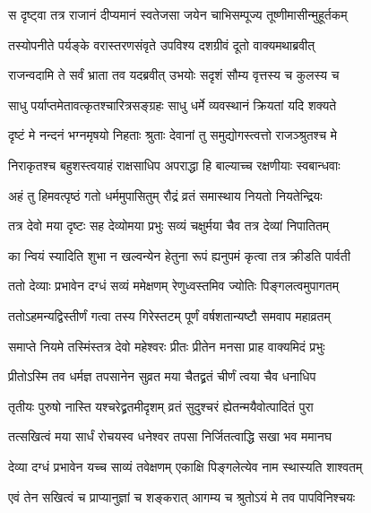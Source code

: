 \twolineshloka
{स दृष्ट्वा तत्र राजानं दीप्यमानं स्वतेजसा}
{जयेन चाभिसम्पूज्य तूष्णीमासीन्मुहूर्तकम्} %

\twolineshloka
{तस्योपनीते पर्यङ्के वरास्तरणसंवृते}
{उपविश्य दशग्रीवं दूतो वाक्यमथाब्रवीत्} %

\twolineshloka
{राजन्वदामि ते सर्वं भ्राता तव यदब्रवीत्}
{उभयोः सदृशं सौम्य वृत्तस्य च कुलस्य च} %

\twolineshloka
{साधु पर्याप्तमेतावत्कृतश्चारित्रसङ्ग्रहः}
{साधु धर्मे व्यवस्थानं क्रियतां यदि शक्यते} %

\twolineshloka
{दृष्टं मे नन्दनं भग्नमृषयो निहताः श्रुताः}
{देवानां तु समुद्योगस्त्वत्तो राजञ्श्रुतश्च मे} %

\twolineshloka
{निराकृतश्च बहुशस्त्वयाहं राक्षसाधिप}
{अपराद्धा हि बाल्याच्च रक्षणीयाः स्वबान्धवाः} %

\twolineshloka
{अहं तु हिमवत्पृष्ठं गतो धर्ममुपासितुम्}
{रौद्रं व्रतं समास्थाय नियतो नियतेन्द्रियः} %

\twolineshloka
{तत्र देवो मया दृष्टः सह देव्योमया प्रभुः}
{सव्यं चक्षुर्मया चैव तत्र देव्यां निपातितम्} %

\twolineshloka
{का न्वियं स्यादिति शुभा न खल्वन्येन हेतुना}
{रूपं ह्यनुपमं कृत्वा तत्र क्रीडति पार्वती} %

\twolineshloka
{ततो देव्याः प्रभावेन दग्धं सव्यं ममेक्षणम्}
{रेणुध्वस्तमिव ज्योतिः पिङ्गलत्वमुपागतम्} %

\twolineshloka
{ततोऽहमन्यद्विस्तीर्णं गत्वा तस्य गिरेस्तटम्}
{पूर्णं वर्षशतान्यष्टौ समवाप महाव्रतम्} %

\twolineshloka
{समाप्ते नियमे तस्मिंस्तत्र देवो महेश्वरः}
{प्रीतः प्रीतेन मनसा प्राह वाक्यमिदं प्रभुः} %

\twolineshloka
{प्रीतोऽस्मि तव धर्मज्ञ तपसानेन सुव्रत}
{मया चैतद्व्रतं चीर्णं त्वया चैव धनाधिप} %

\twolineshloka
{तृतीयः पुरुषो नास्ति यश्चरेद्व्रतमीदृशम्}
{व्रतं सुदुश्चरं ह्येतन्मयैवोत्पादितं पुरा} %

\twolineshloka
{तत्सखित्वं मया सार्धं रोचयस्व धनेश्वर}
{तपसा निर्जितत्वाद्धि सखा भव ममानघ} %

\twolineshloka
{देव्या दग्धं प्रभावेन यच्च साव्यं तवेक्षणम्}
{एकाक्षि पिङ्गलेत्येव नाम स्थास्यति शाश्वतम्} %

\twolineshloka
{एवं तेन सखित्वं च प्राप्यानुज्ञां च शङ्करात्}
{आगम्य च श्रुतोऽयं मे तव पापविनिश्चयः} %

